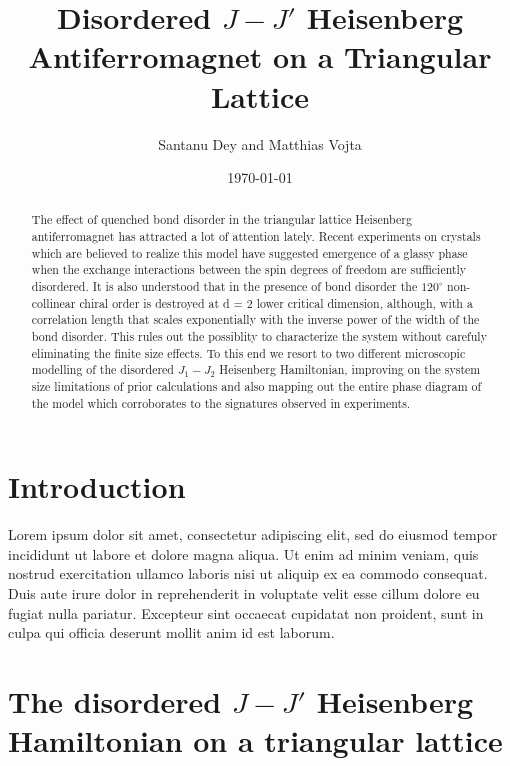 \documentclass[aps,prb,twocolumn,showpacs]{revtex4-1}
\begin{document}
\title{Disordered $J-J'$ Heisenberg Antiferromagnet on a Triangular Lattice}
\author{Santanu Dey and Matthias Vojta}

\pacs{}
\date{\today}

\begin{abstract}

    The effect of quenched bond disorder in the triangular lattice 
    Heisenberg antiferromagnet has attracted a lot of attention lately.
    Recent experiments on crystals which are believed to realize this model
    have suggested emergence of a glassy phase when the exchange 
    interactions between the spin degrees of freedom are sufficiently 
    disordered. It is also understood that in the presence of bond disorder
    the $120^{\circ}$ non-collinear chiral order is destroyed at d = 2 lower 
    critical dimension, although, with a correlation length that scales 
    exponentially with the inverse power of the width of the bond disorder. 
    This rules out the possiblity to characterize the system without carefuly 
    eliminating the finite size effects. To this end we resort to two 
    different microscopic modelling of the disordered $J_1-J_2$ Heisenberg 
    Hamiltonian, improving on the system size limitations of prior 
    calculations and also mapping out the entire phase diagram of the 
    model which corroborates to the signatures observed in experiments.

\end{abstract}

\maketitle

\section{Introduction}

Lorem ipsum dolor sit amet, consectetur adipiscing elit, sed do eiusmod tempor 
incididunt ut labore et dolore magna aliqua. Ut enim ad minim veniam, quis nostrud 
exercitation ullamco laboris nisi ut aliquip ex ea commodo consequat. Duis aute 
irure dolor in reprehenderit in voluptate velit esse cillum dolore eu fugiat nulla 
pariatur. Excepteur sint occaecat cupidatat non proident, sunt in culpa qui officia 
deserunt mollit anim id est laborum.

\section{The disordered $J-J'$ Heisenberg Hamiltonian on a triangular lattice}
\end{document}
